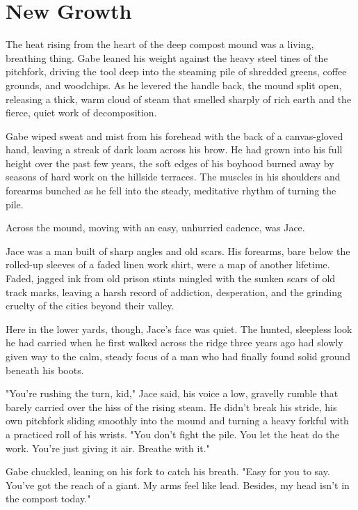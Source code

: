 \chapter{New Growth}






The heat rising from the heart of the deep compost mound was a living, breathing thing. Gabe leaned his weight against the heavy steel tines of the pitchfork, driving the tool deep into the steaming pile of shredded greens, coffee grounds, and woodchips. As he levered the handle back, the mound split open, releasing a thick, warm cloud of steam that smelled sharply of rich earth and the fierce, quiet work of decomposition.

Gabe wiped sweat and mist from his forehead with the back of a canvas-gloved hand, leaving a streak of dark loam across his brow. He had grown into his full height over the past few years, the soft edges of his boyhood burned away by seasons of hard work on the hillside terraces. The muscles in his shoulders and forearms bunched as he fell into the steady, meditative rhythm of turning the pile. 

Across the mound, moving with an easy, unhurried cadence, was Jace. 

Jace was a man built of sharp angles and old scars. His forearms, bare below the rolled-up sleeves of a faded linen work shirt, were a map of another lifetime. Faded, jagged ink from old prison stints mingled with the sunken scars of old track marks, leaving a harsh record of addiction, desperation, and the grinding cruelty of the cities beyond their valley. 

Here in the lower yards, though, Jace’s face was quiet. The hunted, sleepless look he had carried when he first walked across the ridge three years ago had slowly given way to the calm, steady focus of a man who had finally found solid ground beneath his boots. 

"You're rushing the turn, kid," Jace said, his voice a low, gravelly rumble that barely carried over the hiss of the rising steam. He didn't break his stride, his own pitchfork sliding smoothly into the mound and turning a heavy forkful with a practiced roll of his wrists. "You don't fight the pile. You let the heat do the work. You're just giving it air. Breathe with it."

Gabe chuckled, leaning on his fork to catch his breath. "Easy for you to say. You've got the reach of a giant. My arms feel like lead. Besides, my head isn't in the compost today."

